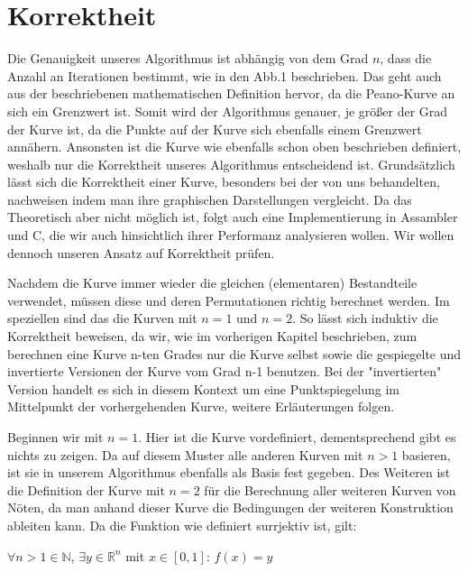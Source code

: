 \documentclass[course=asp]{aspdoc}
\begin{document}
\newpage

\section{Korrektheit} %


Die Genauigkeit unseres Algorithmus ist abhängig von dem Grad $n$, dass die Anzahl an Iterationen bestimmt, wie in den Abb.1 beschrieben. Das geht auch aus der beschriebenen mathematischen Definition hervor, da die Peano-Kurve an sich ein Grenzwert ist. Somit wird der Algorithmus genauer, je größer der Grad der Kurve ist, da die Punkte auf der Kurve sich ebenfalls einem Grenzwert annähern. Ansonsten ist die Kurve wie ebenfalls schon oben beschrieben definiert, weshalb nur die Korrektheit unseres Algorithmus entscheidend ist.
Grundsätzlich lässt sich die Korrektheit einer Kurve, besonders bei der von uns behandelten, nachweisen indem man ihre graphischen Darstellungen vergleicht. Da das Theoretisch aber nicht möglich ist, folgt auch eine Implementierung in Assambler und C, die wir auch hinsichtlich ihrer Performanz analysieren wollen.
Wir wollen dennoch unseren Ansatz auf Korrektheit prüfen.

Nachdem die Kurve immer wieder die gleichen (elementaren) Bestandteile verwendet, müssen diese und deren Permutationen richtig berechnet werden. Im speziellen sind das die Kurven mit $n = 1$ und $n = 2$. So lässt sich induktiv die Korrektheit beweisen, da wir, wie im vorherigen Kapitel beschrieben, zum berechnen eine Kurve n-ten Grades nur die Kurve selbst sowie die gespiegelte und invertierte Versionen der Kurve vom Grad n-1 benutzen. Bei der "invertierten" Version handelt es sich in diesem Kontext um eine Punktspiegelung im Mittelpunkt der vorhergehenden Kurve, weitere Erläuterungen folgen.

Beginnen wir mit $n = 1$. Hier ist die Kurve vordefiniert, dementsprechend gibt es nichts zu zeigen. Da auf diesem Muster alle anderen Kurven mit $n>1$ basieren, ist sie in unserem Algorithmus ebenfalls als Basis fest gegeben.
Des Weiteren ist die Definition der Kurve mit $n = 2$ für die Berechnung aller weiteren Kurven von Nöten, da man anhand dieser Kurve die Bedingungen der weiteren Konstruktion ableiten kann.
Da die Funktion wie definiert surrjektiv ist, gilt: 

$\forall n>1 \in \mathbb{N}$, $\exists y \in \mathbb{R}^n$ mit $x \in [0,1]$: $f(x)= y$	%
\end{document}
